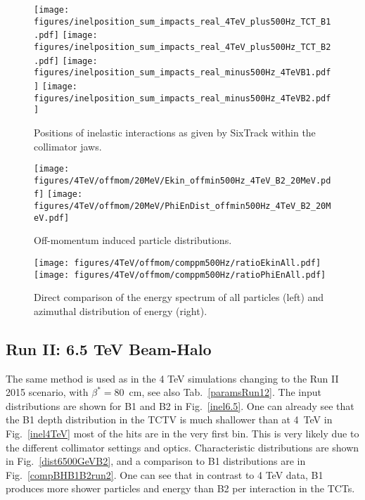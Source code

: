 \begin{figure}
\begin{center}
\texttt{[image: figures/inelposition\_sum\_impacts\_real\_4TeV\_plus500Hz\_TCT\_B1.pdf]}
\texttt{[image: figures/inelposition\_sum\_impacts\_real\_4TeV\_plus500Hz\_TCT\_B2.pdf]}
\texttt{[image: figures/inelposition\_sum\_impacts\_real\_minus500Hz\_4TeVB1.pdf]}
\texttt{[image: figures/inelposition\_sum\_impacts\_real\_minus500Hz\_4TeVB2.pdf]}
\end{center}
\vspace{-0.6cm}
 \caption{Positions of inelastic interactions as given by SixTrack within the collimator jaws.
  \label{inel4TeVOffmom}}
\end{figure}


\begin{figure}
\begin{center}
  \texttt{[image: figures/4TeV/offmom/20MeV/Ekin\_offmin500Hz\_4TeV\_B2\_20MeV.pdf]}
  \texttt{[image: figures/4TeV/offmom/20MeV/PhiEnDist\_offmin500Hz\_4TeV\_B2\_20MeV.pdf]}
\end{center}
\vspace{-0.6cm}
 \caption{Off-momentum induced particle distributions.
  \label{offmom4TeV}}
\end{figure}

\begin{figure}
  \centering
  \texttt{[image: figures/4TeV/offmom/comppm500Hz/ratioEkinAll.pdf]}
  \texttt{[image: figures/4TeV/offmom/comppm500Hz/ratioPhiEnAll.pdf]}
  \caption{Direct comparison of the energy spectrum of all particles (left) and azimuthal distribution of energy (right).
    \label{compPM}}
\end{figure}

\subsection{Run II: 6.5 TeV Beam-Halo}

The same method is used as in the 4 TeV simulations changing to the Run II 2015 scenario, with $\beta^* = 80$~cm, see also Tab.~\ref{paramsRun12}. The input distributions are shown for B1 and B2 in Fig.~\ref{inel6.5}. One can already see that the B1 depth distribution in the TCTV is much shallower than at 4~TeV in Fig.~\ref{inel4TeV} most of the hits are in the very first bin. This is very likely due to the different collimator settings and optics. Characteristic distributions are shown in Fig.~\ref{dist6500GeVB2}, and a comparison to B1 distributions are in Fig.~\ref{compBHB1B2run2}. One can see that in contrast to 4 TeV data, B1 produces more shower particles and energy than B2 per interaction in the TCTs. 


